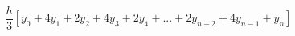 \documentclass[12pt]{amsart}
\begin{document}
\sicpsize
\[
\frac{h}{3}[y_0 + 4y_1 + 2y_2 + 4y_3 + 2y_4 + ... + 2y_{n-2} + 4y_{n-1} + y_n]
\]
\end{document}
